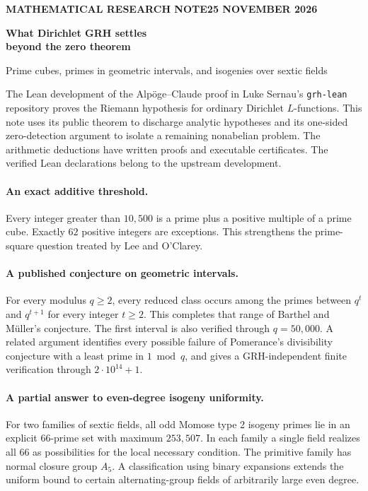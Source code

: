 \documentclass[11pt,letterpaper]{article}
\begin{document}
\thispagestyle{plain}
{\sffamily\small\bfseries\color{link} MATHEMATICAL RESEARCH NOTE\hfill 25 NOVEMBER 2026}\par
\vspace{6pt}
{\fontsize{24}{27}\selectfont\bfseries\color{ink} What Dirichlet GRH settles\\beyond the zero theorem\par}
\vspace{4pt}
{\large Prime cubes, primes in geometric intervals, and isogenies over sextic fields\par}
\medskip
The Lean development of the Alp\"oge--Claude proof in Luke Sernau's
\texttt{grh-lean} repository proves the Riemann hypothesis for ordinary
Dirichlet $L$-functions. This note uses its public theorem to discharge
analytic hypotheses and its one-sided zero-detection argument to isolate a
remaining nonabelian problem. The arithmetic deductions have written proofs
and executable certificates. The verified Lean declarations belong to the
upstream development.

\paragraph{An exact additive threshold.}
Every integer greater than $10{,}500$ is a prime plus a positive multiple
of a prime cube. Exactly $62$ positive integers are exceptions. This
strengthens the prime-square question treated by Lee and O'Clarey.

\paragraph{A published conjecture on geometric intervals.}
For every modulus $q\ge2$, every reduced class occurs among the primes
between $q^t$ and $q^{t+1}$ for every integer $t\ge2$. This completes that
range of Barthel and M\"uller's conjecture. The first interval is also
verified through $q=50{,}000$. A related argument identifies every possible
failure of Pomerance's divisibility conjecture with a least prime in
$1\bmod q$, and gives a GRH-independent finite verification through
$2\cdot10^{14}+1$.

\paragraph{A partial answer to even-degree isogeny uniformity.}
For two families of sextic fields, all odd Momose type 2 isogeny primes lie
in an explicit $66$-prime set with maximum $253{,}507$. In each family a
single field realizes all $66$ as possibilities for the local necessary
condition. The primitive family has normal closure group $A_5$.
A classification using binary expansions extends the uniform bound to
certain alternating-group fields of arbitrarily large even degree.
\end{document}
